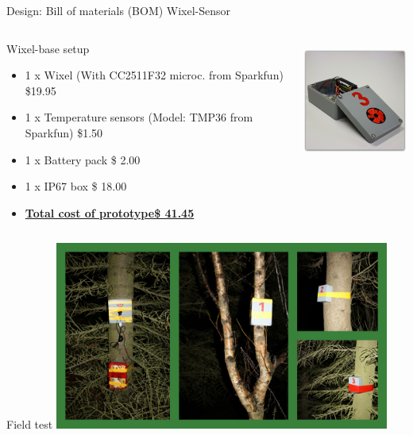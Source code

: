\documentclass{beamer}
\begin{document}
\begin{frame}{Design: Bill of materials (BOM) Wixel-Sensor}
\begin{columns}[T]
	\begin{column}[T]{6cm}
		Wixel-base setup
		\begin{itemize} \small
		\item 1 x Wixel   (With CC2511F32 microc. from Sparkfun) \$19.95
		\item 1 x Temperature sensors (Model: TMP36 from Sparkfun) \$1.50
		\item 1 x Battery pack \$ 2.00
		\item 1 x IP67 box \$ 18.00
		\item \textbf{\underline{Total cost of prototype\$ 41.45}} 
		\end{itemize}
	\end{column}
		\begin{column}[T]{4cm}
		\includegraphics[height=4cm]{graphics/Field_pictures/Wixel_sensor.JPG}
		\end{column}
\end{columns}
\end{frame}

\begin{frame}{Field test}
\centering
\includegraphics[width=11cm]{graphics/Field_pictures/Field_DataLogger.jpg}
\end{frame}
\end{document}
